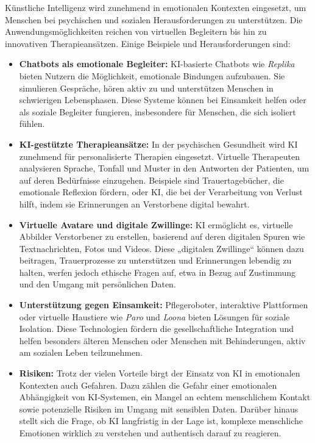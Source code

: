 \documentclass[a4paper,12pt]{article}
\begin{document}
Künstliche Intelligenz wird zunehmend in emotionalen Kontexten eingesetzt, um Menschen bei psychischen und sozialen Herausforderungen zu unterstützen. Die Anwendungsmöglichkeiten reichen von virtuellen Begleitern bis hin zu innovativen Therapieansätzen. Einige Beispiele und Herausforderungen sind:

\begin{itemize} \item \textbf{Chatbots als emotionale Begleiter:}
KI-basierte Chatbots wie \textit{Replika} bieten Nutzern die Möglichkeit, emotionale Bindungen aufzubauen. Sie simulieren Gespräche, hören aktiv zu und unterstützen Menschen in schwierigen Lebensphasen. Diese Systeme können bei Einsamkeit helfen oder als soziale Begleiter fungieren, insbesondere für Menschen, die sich isoliert fühlen.

\item \textbf{KI-gestützte Therapieansätze:}  
In der psychischen Gesundheit wird KI zunehmend für personalisierte Therapien eingesetzt. Virtuelle Therapeuten analysieren Sprache, Tonfall und Muster in den Antworten der Patienten, um auf deren Bedürfnisse einzugehen. Beispiele sind Trauertagebücher, die emotionale Reflexion fördern, oder KI, die bei der Verarbeitung von Verlust hilft, indem sie Erinnerungen an Verstorbene digital bewahrt.

\item \textbf{Virtuelle Avatare und digitale Zwillinge:}  
KI ermöglicht es, virtuelle Abbilder Verstorbener zu erstellen, basierend auf deren digitalen Spuren wie Textnachrichten, Fotos und Videos. Diese „digitalen Zwillinge“ können dazu beitragen, Trauerprozesse zu unterstützen und Erinnerungen lebendig zu halten, werfen jedoch ethische Fragen auf, etwa in Bezug auf Zustimmung und den Umgang mit persönlichen Daten.

\item \textbf{Unterstützung gegen Einsamkeit:}  
Pflegeroboter, interaktive Plattformen oder virtuelle Haustiere wie \textit{Paro} und \textit{Loona} bieten Lösungen für soziale Isolation. Diese Technologien fördern die gesellschaftliche Integration und helfen besonders älteren Menschen oder Menschen mit Behinderungen, aktiv am sozialen Leben teilzunehmen.

\item \textbf{Risiken:}  
Trotz der vielen Vorteile birgt der Einsatz von KI in emotionalen Kontexten auch Gefahren. Dazu zählen die Gefahr einer emotionalen Abhängigkeit von KI-Systemen, ein Mangel an echtem menschlichem Kontakt sowie potenzielle Risiken im Umgang mit sensiblen Daten. Darüber hinaus stellt sich die Frage, ob KI langfristig in der Lage ist, komplexe menschliche Emotionen wirklich zu verstehen und authentisch darauf zu reagieren.
\end{itemize}
\end{document}
